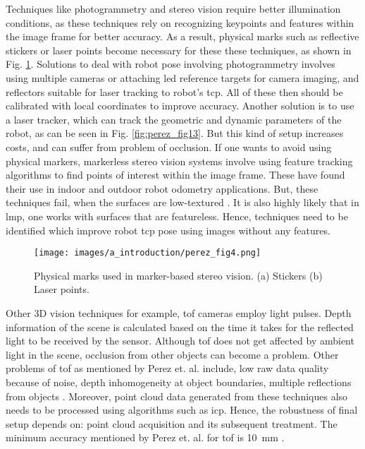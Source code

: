     \vspace{5mm}
    
    
    \noindent Techniques like photogrammetry and stereo vision require better illumination conditions, as these techniques rely on recognizing keypoints and features within the image frame for better accuracy. As a result, physical marks such as reflective stickers or laser points become necessary for these these techniques, as shown in Fig. \ref{fig:fig_perez_4}. Solutions to deal with robot pose involving photogrammetry involves using multiple cameras or attaching \gls{led} reference targets for camera imaging, and reflectors suitable for laser tracking to robot's \gls{tcp}. All of these then should be calibrated with local coordinates to improve accuracy. Another solution is to use a laser tracker, which can track the geometric and dynamic parameters of the robot, as can be seen in Fig. \ref{fig:perez_fig13}. But this kind of setup increases costs, and can suffer from problem of occlusion. If one wants to avoid using physical markers, markerless stereo vision systems involve using feature tracking algorithms to find points of interest within the image frame. These have found their use in indoor and outdoor robot odometry applications. But, these techniques fail, when the surfaces are low-textured \cite{perez}. It is also highly likely that in \Gls{lmp}, one works with surfaces that are featureless. Hence, techniques need to be identified which improve robot \gls{tcp} pose using images without any features.

    \vspace{5mm}
    \begin{figure}[h]
        \hspace{2cm}
        \texttt{[image: images/a\_introduction/perez\_fig4.png]}
        \caption{Physical marks used in marker-based stereo vision. (a) Stickers (b) Laser points. \cite{perez}}
        \label{fig:fig_perez_4}
    \end{figure}
    \vspace{5mm}
    
    \noindent Other 3D vision techniques for example, \gls{tof} cameras employ light pulses. Depth information of the scene is calculated based on the time it takes for the reflected light to be received by the sensor. Although \gls{tof} does not get affected by ambient light in the scene, occlusion from other objects can become a problem. Other problems of \gls{tof} as mentioned by Perez et. al. include, low raw data quality because of noise, depth inhomogeneity at object boundaries, multiple reflections from objects \cite{perez}. Moreover, point cloud data generated from these techniques also needs to be processed using algorithms such as \gls{icp}. Hence, the robustness of final setup depends on: point cloud acquisition and its subsequent treatment. The minimum accuracy mentioned by Perez et. al. for \gls{tof} is \SI{10}{\milli\meter} \cite{perez}.
    
